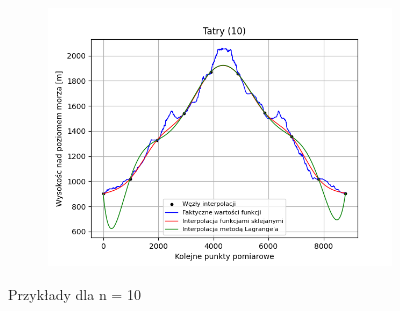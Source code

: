 \documentclass[fleqn]{article}
\begin{document}
\begin{figure}[h]
\begin{subfigure}{.33\textwidth}
          \label{fig:sub2}
        \end{subfigure}%
        \begin{subfigure}{.33\textwidth}
          \centering
          \includegraphics[width=\linewidth]{plot_10_points_Tatry.png}
          \label{fig:sub3}
        \end{subfigure}
        \caption{Przykłady dla n = 10}
        \label{fig:test}
    \end{figure}
\end{document}
